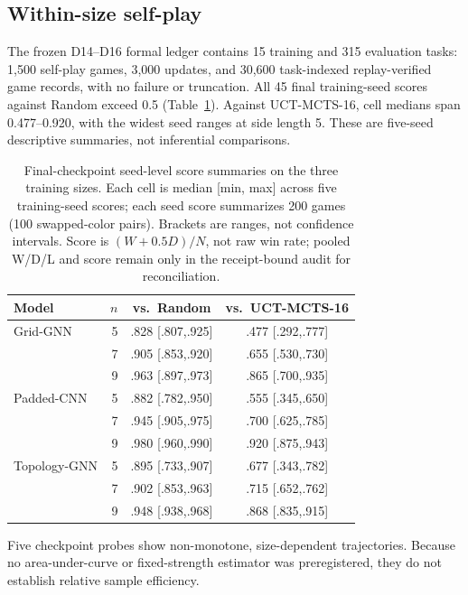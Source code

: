 \documentclass[10pt,letterpaper]{article}
\begin{document}
\subsection{Within-size self-play}

The frozen D14--D16 formal ledger contains 15 training and 315 evaluation tasks: 1,500
self-play games, 3,000 updates, and 30,600 task-indexed replay-verified game records,
with no failure or truncation. All 45 final training-seed scores against Random
exceed 0.5 (Table~\ref{tab:final-search}). Against UCT-MCTS-16, cell medians
span 0.477--0.920, with the widest seed ranges at side length 5. These are
five-seed descriptive summaries, not inferential comparisons.

\begin{table}[H]
  \centering
  \small
  \caption{Final-checkpoint seed-level score summaries on the three training
  sizes. Each cell is median [min, max] across five training-seed scores; each
  seed score summarizes 200 games (100 swapped-color pairs). Brackets are
  ranges, not confidence intervals. Score is $(W+0.5D)/N$, not raw win rate;
  pooled W/D/L and score remain only in the receipt-bound audit for
  reconciliation.}
  \label{tab:final-search}
  \begin{tabular}{lrcc}
    \toprule
    Model & $n$ & vs.\ Random & vs.\ UCT-MCTS-16 \\
    \midrule
    Grid-GNN & 5 & .828 [.807,.925] & .477 [.292,.777] \\
             & 7 & .905 [.853,.920] & .655 [.530,.730] \\
             & 9 & .963 [.897,.973] & .865 [.700,.935] \\
    Padded-CNN & 5 & .882 [.782,.950] & .555 [.345,.650] \\
               & 7 & .945 [.905,.975] & .700 [.625,.785] \\
               & 9 & .980 [.960,.990] & .920 [.875,.943] \\
    Topology-GNN & 5 & .895 [.733,.907] & .677 [.343,.782] \\
                 & 7 & .902 [.853,.963] & .715 [.652,.762] \\
                 & 9 & .948 [.938,.968] & .868 [.835,.915] \\
    \bottomrule
  \end{tabular}
\end{table}

Five checkpoint probes show non-monotone, size-dependent trajectories. Because
no area-under-curve or fixed-strength estimator was preregistered, they do not
establish relative sample efficiency.
\end{document}
